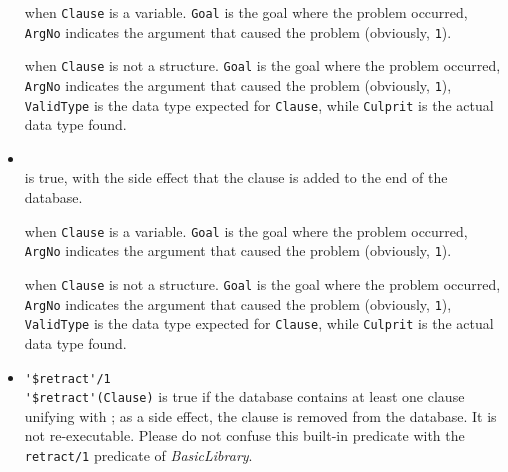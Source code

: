 \begin{itemize}

     when \texttt{Clause} is a variable. \texttt{Goal} is the goal where the problem occurred, \texttt{ArgNo} indicates the argument that caused the problem (obviously, \texttt{1}).

     when \texttt{Clause} is not a structure. \texttt{Goal} is the goal where the problem occurred, \texttt{ArgNo} indicates the argument that caused the problem (obviously, \texttt{1}), \texttt{ValidType} is the data type expected for \texttt{Clause}, while \texttt{Culprit} is the actual data type found.

\item {}\\
    \noindent{} is true, with the side effect that
    the clause  is added to the end of the database.


     when \texttt{Clause} is a variable. \texttt{Goal} is the goal where the problem occurred, \texttt{ArgNo} indicates the argument that caused the problem (obviously, \texttt{1}).

     when \texttt{Clause} is not a structure. \texttt{Goal} is the goal where the problem occurred, \texttt{ArgNo} indicates the argument that caused the problem (obviously, \texttt{1}), \texttt{ValidType} is the data type expected for \texttt{Clause}, while \texttt{Culprit} is the actual data type found.

\item \verb|'$retract'/1|\\
    \noindent\verb|'$retract'(Clause)| is true if the database contains
    at least one clause unifying with ; as a side effect, the
    clause is removed from the database. It is not re-executable.
    Please do not confuse this built-in predicate with the \texttt{retract/1} predicate of \textit{BasicLibrary}.



\end{itemize}
